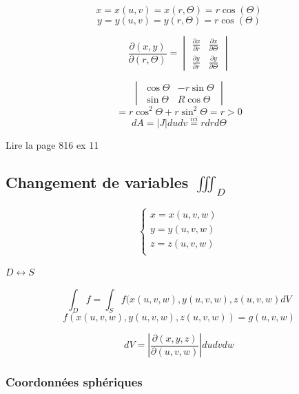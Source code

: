 $$x=x(u,v)=x(r,\Theta)=r\cos(\Theta)$$
$$y=y(u,v)=y(r,\Theta)=r\cos(\Theta)$$





\[
\frac{\partial (x,y)}{\partial (r, \Theta)} =
\begin{vmatrix}
\frac{\partial x}{\partial r}& \frac{\partial x}{\partial \Theta}\\
\frac{\partial y}{\partial r}& \frac{\partial y}{\partial \Theta}
\end{vmatrix}
\]

$$\begin{vmatrix}
\cos\Theta & -r\sin\Theta\\
\sin\Theta & R\cos\Theta
\end{vmatrix}$$
\[=r\cos^2\Theta +r\sin^2\Theta = r > 0\]
$$dA = |J|dudv \overset{ici}{=}r dr d\Theta $$

\begin{myrem}

Lire la page 816 ex 11
\end{myrem}

\subsection{Changement de variables $ \iiint_D $}
$$
\left\{
\begin{array}{l}
x=x(u,v,w)\\
y=y(u,v,w)\\
z=z(u,v,w)\\
\end{array}
\right.
$$

$D \longleftrightarrow S $

\[\int_D f = \int_S f (x(u,v,w),y(u,v,w),z(u,v,w) dV\]
\[f (x(u,v,w),y(u,v,w),z(u,v,w)) = g(u,v,w)\]

\[dV=\left|\frac{\partial(x,y,z)}{\partial(u,v,w)}\right|dudvdw\]



\subsubsection{Coordonnées sphériques}


